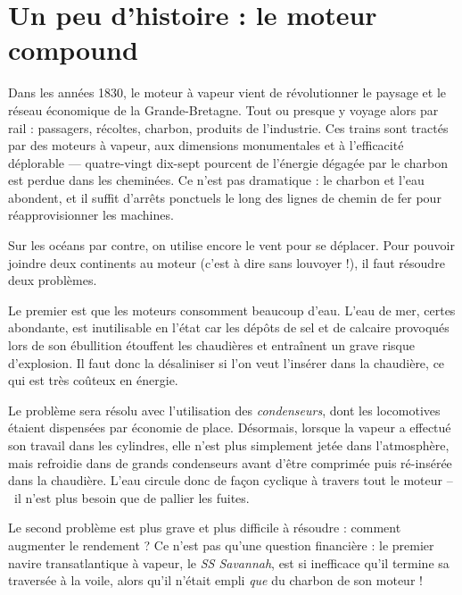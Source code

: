\atstartofhistorysection
\section[Un peu d’histoire : le moteur compound]{Un peu d’histoire :\onlyamphibook{\\} le moteur compound}
\label{ch_histoire_compound}

	Dans les années 1830, le moteur à vapeur vient de révolutionner le paysage et le réseau économique de la Grande-Bretagne. Tout ou presque y voyage alors par rail : passagers, récoltes, charbon, produits de l’industrie. Ces trains sont tractés par des moteurs à vapeur, aux dimensions monumentales et à l’efficacité déplorable — quatre-vingt dix-sept pourcent de l’énergie dégagée par le charbon est perdue dans les cheminées. Ce n’est pas dramatique : le charbon et l’eau abondent, et il suffit d’arrêts ponctuels le long des lignes de chemin de fer pour réapprovisionner les machines.

	Sur les océans par contre, on utilise encore le vent pour se déplacer. Pour pouvoir joindre deux continents au moteur (c’est à dire sans louvoyer !), il faut résoudre deux problèmes.

	Le premier est que les moteurs consomment beaucoup d’eau. L’eau de mer, certes abondante, est inutilisable en l’état car les dépôts de sel et de calcaire provoqués lors de son ébullition étouffent les chaudières et entraînent un grave risque d’explosion. Il faut donc la désaliniser si l’on veut l’insérer dans la chaudière, ce qui est très coûteux en énergie.

	Le problème sera résolu avec l’utilisation des \textit{condenseurs}, dont les locomotives étaient dispensées par économie de place. Désormais, lorsque la vapeur a effectué son travail dans les cylindres, elle n’est plus simplement jetée dans l’atmosphère, mais refroidie dans de grands condenseurs avant d’être comprimée puis ré-insérée dans la chaudière. L’eau circule donc de façon cyclique à travers tout le moteur --\ il n’est plus besoin que de pallier les fuites.

	Le second problème est plus grave et plus difficile à résoudre : comment augmenter le rendement ? Ce n’est pas qu’une question financière : le premier navire transatlantique à vapeur, le \textit{SS Savannah}, est si inefficace qu’il termine sa traversée à la voile, alors qu’il n’était empli \emph{que} du charbon de son moteur !


